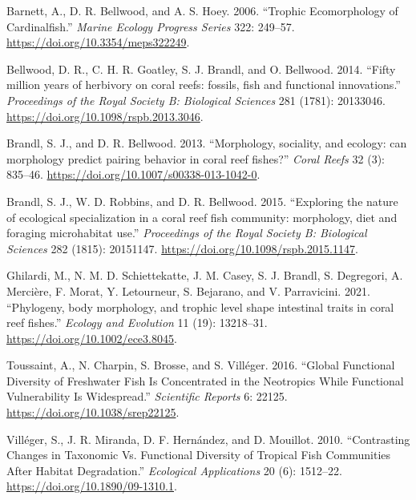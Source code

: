 \documentclass[
  letterpaper,
]{scrbook}
\newlength{\cslhangindent}
\newlength{\cslentryspacingunit} %
\newenvironment{CSLReferences}[2] %
 {%
  \setlength{\parindent}{0pt}
  \ifodd #1
  \let\oldpar\par
  \def\par{\hangindent=\cslhangindent\oldpar}
  \fi
  \setlength{\parskip}{#2\cslentryspacingunit}
 }%
 {}
\begin{document}
\hypertarget{refs}{}
\begin{CSLReferences}{1}{0}
\leavevmode{}%
Barnett, A., D. R. Bellwood, and A. S. Hoey. 2006. {``Trophic
Ecomorphology of Cardinalfish.''} \emph{Marine Ecology Progress Series}
322: 249--57. \url{https://doi.org/10.3354/meps322249}.

\leavevmode{}%
Bellwood, D. R., C. H. R. Goatley, S. J. Brandl, and O. Bellwood. 2014.
{``{Fifty million years of herbivory on coral reefs: fossils, fish and
functional innovations}.''} \emph{Proceedings of the Royal Society B:
Biological Sciences} 281 (1781): 20133046.
\url{https://doi.org/10.1098/rspb.2013.3046}.

\leavevmode{}%
Brandl, S. J., and D. R. Bellwood. 2013. {``{Morphology, sociality, and
ecology: can morphology predict pairing behavior in coral reef
fishes?}''} \emph{Coral Reefs} 32 (3): 835--46.
\url{https://doi.org/10.1007/s00338-013-1042-0}.

\leavevmode{}%
Brandl, S. J., W. D. Robbins, and D. R. Bellwood. 2015. {``{Exploring
the nature of ecological specialization in a coral reef fish community:
morphology, diet and foraging microhabitat use}.''} \emph{Proceedings of
the Royal Society B: Biological Sciences} 282 (1815): 20151147.
\url{https://doi.org/10.1098/rspb.2015.1147}.

\leavevmode{}%
Ghilardi, M., N. M. D. Schiettekatte, J. M. Casey, S. J. Brandl, S.
Degregori, A. Mercière, F. Morat, Y. Letourneur, S. Bejarano, and V.
Parravicini. 2021. {``{Phylogeny, body morphology, and trophic level
shape intestinal traits in coral reef fishes}.''} \emph{Ecology and
Evolution} 11 (19): 13218--31. \url{https://doi.org/10.1002/ece3.8045}.

\leavevmode{}%
Toussaint, A., N. Charpin, S. Brosse, and S. Villéger. 2016. {``Global
Functional Diversity of Freshwater Fish Is Concentrated in the
Neotropics While Functional Vulnerability Is Widespread.''}
\emph{Scientific Reports} 6: 22125.
\url{https://doi.org/10.1038/srep22125}.

\leavevmode{}%
Villéger, S., J. R. Miranda, D. F. Hernández, and D. Mouillot. 2010.
{``Contrasting Changes in Taxonomic Vs. Functional Diversity of Tropical
Fish Communities After Habitat Degradation.''} \emph{Ecological
Applications} 20 (6): 1512--22. \url{https://doi.org/10.1890/09-1310.1}.

\end{CSLReferences}


\backmatter
\end{document}
